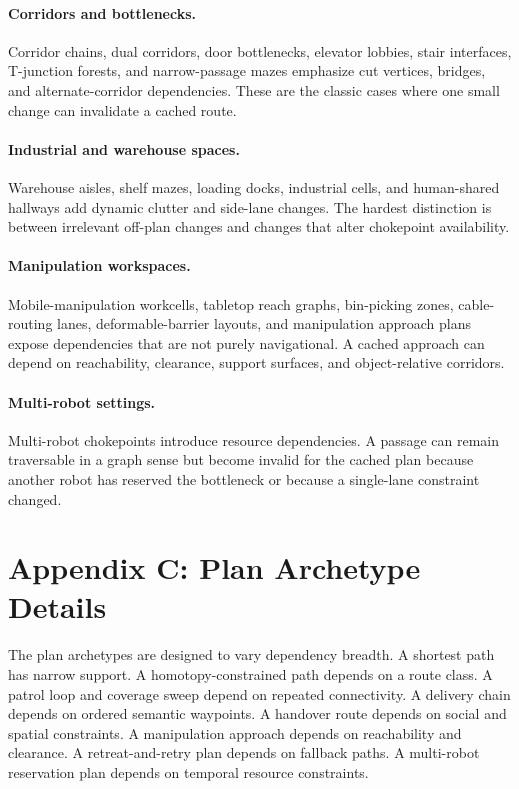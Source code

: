\documentclass{article}
\begin{document}
\paragraph{Corridors and bottlenecks.}
Corridor chains, dual corridors, door bottlenecks, elevator lobbies, stair interfaces, T-junction forests, and narrow-passage mazes emphasize cut vertices, bridges, and alternate-corridor dependencies. These are the classic cases where one small change can invalidate a cached route.

\paragraph{Industrial and warehouse spaces.}
Warehouse aisles, shelf mazes, loading docks, industrial cells, and human-shared hallways add dynamic clutter and side-lane changes. The hardest distinction is between irrelevant off-plan changes and changes that alter chokepoint availability.

\paragraph{Manipulation workspaces.}
Mobile-manipulation workcells, tabletop reach graphs, bin-picking zones, cable-routing lanes, deformable-barrier layouts, and manipulation approach plans expose dependencies that are not purely navigational. A cached approach can depend on reachability, clearance, support surfaces, and object-relative corridors.

\paragraph{Multi-robot settings.}
Multi-robot chokepoints introduce resource dependencies. A passage can remain traversable in a graph sense but become invalid for the cached plan because another robot has reserved the bottleneck or because a single-lane constraint changed.

\section{Appendix C: Plan Archetype Details}

The plan archetypes are designed to vary dependency breadth. A shortest path has narrow support. A homotopy-constrained path depends on a route class. A patrol loop and coverage sweep depend on repeated connectivity. A delivery chain depends on ordered semantic waypoints. A handover route depends on social and spatial constraints. A manipulation approach depends on reachability and clearance. A retreat-and-retry plan depends on fallback paths. A multi-robot reservation plan depends on temporal resource constraints.
\end{document}
